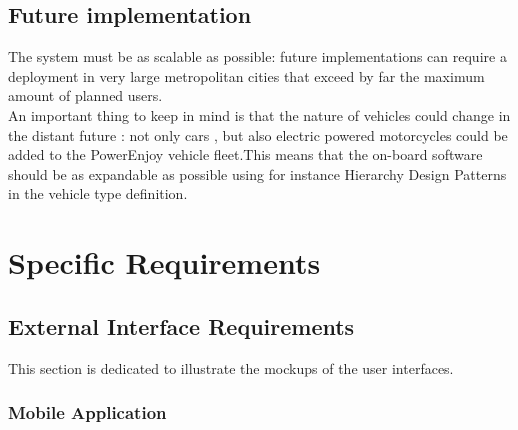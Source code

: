 \documentclass[12pt]{article}
\begin{document}
	\subsection{Future implementation}
	The system must be as scalable as possible: future implementations can require a deployment in very large metropolitan cities that exceed by far the maximum amount of planned users.\\ An important thing to keep in mind is that the nature of vehicles could change in the distant future : not only cars , but also electric powered motorcycles could be added to the PowerEnjoy vehicle fleet.This means that the on-board software should be as expandable as possible using for instance Hierarchy Design Patterns in the vehicle type definition.
	 

\newpage
\FloatBarrier

\section{\Large Specific Requirements}
\subsection{External Interface Requirements}
 This section is dedicated to illustrate the mockups of the user interfaces.
 \subsubsection{Mobile Application}
 	
\end{document}
